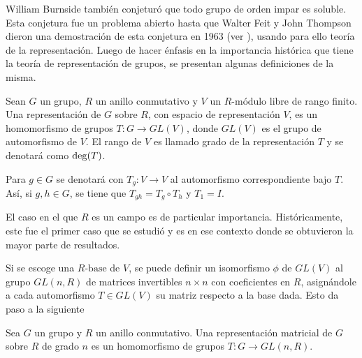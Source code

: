 William Burnside también conjeturó que todo grupo de orden impar es soluble. Esta conjetura fue un problema abierto hasta que Walter Feit y John Thompson dieron una demostración de esta conjetura en 1963 (ver \cite{bib:solubilidad}), usando para ello teoría de la representación. Luego de hacer énfasis en la importancia histórica que tiene la teoría de representación de grupos, se presentan algunas definiciones de la~ misma.
\begin{definicion}
Sean $G$ un grupo, $R$ un anillo conmutativo y $V$ un $R\mbox{-módulo}$ libre de rango finito. Una representación de $G$ sobre $R$, con espacio de representación $V$, es un homomorfismo de grupos $T \colon G \to GL(V)$, donde $GL(V)$ es el grupo de automorfismo de $V$. El rango de $V$ es llamado grado de la representación $T$ y se denotará como $\operatorname{deg}(T)$.
\end{definicion}

Para $g \in G$ se denotará con $T_g \colon V \to V$ al automorfismo correspondiente bajo $T$. Así, si $g, h \in G$, se tiene que $T_{gh} = T_g \circ T_h$ y $T_1 = I$.

El caso en el que $R$ es un campo es de particular importancia. Históricamente, este fue el primer caso que se estudió y es en ese contexto donde se obtuvieron la mayor parte de resultados. 

Si se escoge una $R\mbox{-base}$ de $V$, se puede definir un isomorfismo $\phi$ de $GL(V)$ al grupo $GL(n,R)$ de matrices invertibles $n\times n$ con coeficientes en $R$, asignándole a cada automorfismo $T \in GL(V)$ su matriz respecto a la base dada. Esto da paso a la siguiente

\begin{definicion}
Sea $G$ un grupo y $R$ un anillo conmutativo. Una representación matricial de $G$ sobre $R$ de grado $n$ es un homomorfismo de grupos $T \colon G \to GL(n,R)$.
\end{definicion} 

